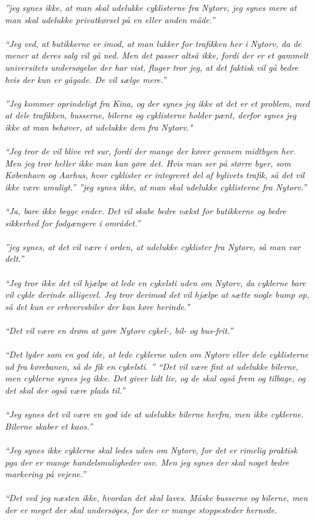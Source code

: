 \emph{”jeg synes ikke, at man skal udelukke cyklisterne fra Nytorv, jeg synes mere at man skal udelukke privatkørsel på en eller anden måde.”
\\\\
  “Jeg ved, at butikkerne er imod, at man lukker for trafikken her i Nytorv, da de mener at deres salg vil gå ned. Men det passer altså ikke, fordi der er et gammelt universitets undersøgelse der har vist, fluger tror jeg, at det faktisk vil gå bedre hvis der kun er gågade. De vil sælge mere.”
\\\\
  ”Jeg kommer oprindeligt fra Kina, og der synes jeg ikke at det er et problem, med at dele trafikken, busserne, bilerne og cyklisterne holder pænt, derfor synes jeg ikke at man behøver, at udelukke dem fra Nytorv."
\\\\
  “Jeg tror de vil blive ret sur, fordi der mange der kører gennem midtbyen her. Men jeg tror heller ikke man kan gøre det. Hvis man ser på større byer, som København og Aarhus, hvor cyklister er integreret del af bylivets trafik, så det vil ikke være umuligt.”
  ”jeg synes ikke, at man skal udelukke cyklisterne fra Nytorv.”
\\\\

  “Ja, bare ikke begge ender. Det vil skabe bedre vækst for butikkerne og bedre sikkerhed for fodgængere i området.”
\\\\
  ”jeg synes, at det vil være i orden, at udelukke cyklister fra Nytorv, så man var delt.”
\\\\
  “Jeg tror ikke det vil hjælpe at lede en cykelsti uden om Nytorv, da cyklerne bare vil cykle derinde alligevel. Jeg tror derimod det vil hjælpe at sætte nogle bump op, så det kun er erhvervsbiler der kan køre herinde.”
\\\\
  “Det vil være en drøm at gøre Nytorv cykel-, bil- og bus-frit.”
\\\\
  “Det lyder som en god ide, at lede cyklerne uden om Nytorv eller dele cyklisterne ud fra kørebanen, så de fik en cykelsti. ”
  “Det vil være fint at udelukke bilerne, men cyklerne synes jeg ikke. Det giver lidt liv, og de skal også frem og tilbage, og det skal der også være plads til.”
\\\\

  “Jeg synes det vil være en god ide at udelukke bilerne herfra, men ikke cyklerne. Bilerne skaber et kaos.”
\\\\
  “Jeg synes ikke cyklerne skal ledes uden om Nytorv, for det er rimelig praktisk pga der er mange handelsmuligheder osv. Men jeg synes der skal noget bedre markering på vejene.”
\\\\
  “Det ved jeg næsten ikke, hvordan det skal laves. Måske busserne og bilerne, men der er meget der skal undersøges, for der er mange stoppesteder hernede.
}
